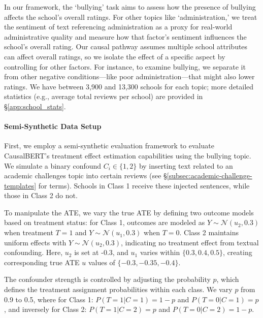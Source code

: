 \documentclass[11pt]{article}
\begin{document}
In our framework, the `bullying' task aims to assess how the presence of bullying affects the school's overall ratings. For other topics like `administration,' we treat the sentiment of text referencing administration as a proxy for real-world administrative quality and measure how that factor's sentiment influences the school's overall rating. Our causal pathway assumes multiple school attributes can affect overall ratings, so we isolate the effect of a specific aspect by controlling for other factors. For instance, to examine bullying, we separate it from other negative conditions—like poor administration—that might also lower ratings. 
We have between 3,900 and 13,300 schools for each topic; more detailed statistics (e.g., average total reviews per school) are provided in \S\ref{app:school_stats}.
 
\paragraph{Semi-Synthetic Data Setup}
\label{sec:Semi-synthetic data_setup}

First, we employ a semi-synthetic evaluation framework \cite{weld2022adjusting} to evaluate CausalBERT's treatment effect estimation capabilities using the bullying topic. We simulate a binary confound $C_i \in \{1, 2\}$ by inserting text related to an academic challenges topic into certain reviews (see \S\ref{subsec:academic-challenge-templates} for terms). Schools in Class 1 receive these injected sentences, while those in Class 2 do not.

To manipulate the ATE, we vary the true ATE by defining two outcome models based on treatment status: for Class 1, outcomes are modeled as \(Y \sim \mathcal{N}(u_2, 0.3)\) when treatment \(T=1\) and \(Y \sim \mathcal{N}(u_1, 0.3)\) when \(T=0\). Class 2 maintains uniform effects with \(Y \sim \mathcal{N}(u_2, 0.3)\), indicating no treatment effect from textual confounding. Here, \(u_2\) is set at -0.3, and \(u_1\) varies within $\{0.3, 0.4, 0.5\}$, creating corresponding true ATE \(u\) values of $\{-0.3, -0.35, -0.4\}$.

The confounder strength is controlled by adjusting the probability \(p\), which defines the treatment assignment probabilities within each class. We vary \(p\) from 0.9 to 0.5, where for Class 1: \(P(T=1 | C=1) = 1-p\) and \(P(T=0 | C=1) = p\), and inversely for Class 2: \(P(T=1 | C=2) = p\) and \(P(T=0 | C=2) = 1-p\).
\end{document}
